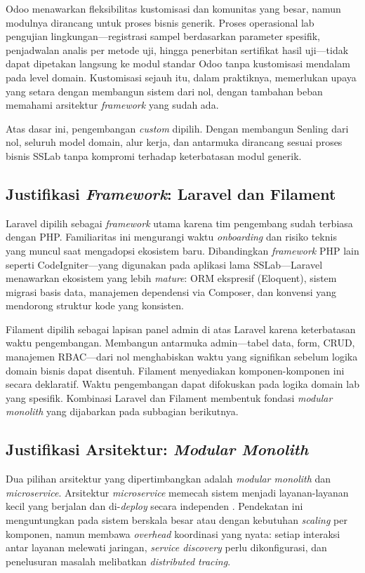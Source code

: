 Odoo menawarkan fleksibilitas kustomisasi dan komunitas yang besar, namun modulnya dirancang untuk proses bisnis generik. Proses operasional lab pengujian lingkungan—registrasi sampel berdasarkan parameter spesifik, penjadwalan analis per metode uji, hingga penerbitan sertifikat hasil uji—tidak dapat dipetakan langsung ke modul standar Odoo tanpa kustomisasi mendalam pada level domain. Kustomisasi sejauh itu, dalam praktiknya, memerlukan upaya yang setara dengan membangun sistem dari nol, dengan tambahan beban memahami arsitektur \textit{framework} yang sudah ada.

Atas dasar ini, pengembangan \textit{custom} dipilih. Dengan membangun Senling dari nol, seluruh model domain, alur kerja, dan antarmuka dirancang sesuai proses bisnis SSLab tanpa kompromi terhadap keterbatasan modul generik.

\subsection{Justifikasi \textit{Framework}: Laravel dan Filament}

Laravel dipilih sebagai \textit{framework} utama karena tim pengembang sudah terbiasa dengan PHP. Familiaritas ini mengurangi waktu \textit{onboarding} dan risiko teknis yang muncul saat mengadopsi ekosistem baru. Dibandingkan \textit{framework} PHP lain seperti CodeIgniter—yang digunakan pada aplikasi lama SSLab—Laravel menawarkan ekosistem yang lebih \textit{mature}: ORM ekspresif (Eloquent), sistem migrasi basis data, manajemen dependensi via Composer, dan konvensi yang mendorong struktur kode yang konsisten.

Filament dipilih sebagai lapisan panel admin di atas Laravel karena keterbatasan waktu pengembangan. Membangun antarmuka admin—tabel data, form, CRUD, manajemen RBAC—dari nol menghabiskan waktu yang signifikan sebelum logika domain bisnis dapat disentuh. Filament menyediakan komponen-komponen ini secara deklaratif. Waktu pengembangan dapat difokuskan pada logika domain lab yang spesifik. Kombinasi Laravel dan Filament membentuk fondasi \textit{modular monolith} yang dijabarkan pada subbagian berikutnya.

\subsection{Justifikasi Arsitektur: \textit{Modular Monolith}}

Dua pilihan arsitektur yang dipertimbangkan adalah \textit{modular monolith} dan \textit{microservice}. Arsitektur \textit{microservice} memecah sistem menjadi layanan-layanan kecil yang berjalan dan di-\textit{deploy} secara independen \cite{fowler2014microservices}. Pendekatan ini menguntungkan pada sistem berskala besar atau dengan kebutuhan \textit{scaling} per komponen, namun membawa \textit{overhead} koordinasi yang nyata: setiap interaksi antar layanan melewati jaringan, \textit{service discovery} perlu dikonfigurasi, dan penelusuran masalah melibatkan \textit{distributed tracing}.

